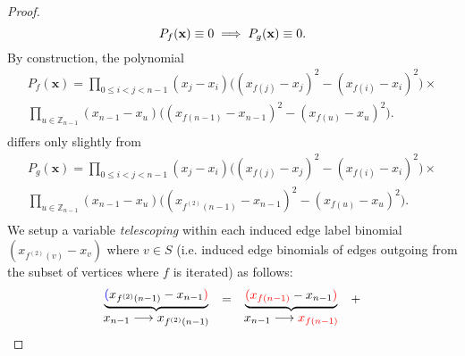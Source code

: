 \begin{proof}
\begin{equation}\label{eq:contrapositive}
    P_{f}({\bf x})\equiv0\implies P_{g}({\bf x})\equiv0.
\end{equation}
By construction, the polynomial
\begin{equation}\label{eq:Pf_broken}
\begin{array}{c}
P_{f}(\mathbf{x})=\underset{0\le i<j<n-1}{\prod}(x_{j}-x_{i})\big((x_{f(j)}-x_{j})^{2}-(x_{f(i)}-x_{i})^{2}\big)\times\\[10pt]
\underset{u\in\mathbb{Z}_{n-1}}{\prod}(x_{n-1}-x_{u})\big((x_{f(n-1)}-x_{n-1})^{2}-(x_{f(u)}-x_{u})^{2}\big).\\[10pt]
\end{array}
\end{equation}
differs only slightly from
\begin{equation}\label{eq:Pg_broken}
\begin{array}{c}
P_{g}(\mathbf{x})=\underset{0\le i<j<n-1}{\prod}(x_{j}-x_{i})\big((x_{f(j)}-x_{j})^{2}-(x_{f(i)}-x_{i})^{2}\big)\times\\[10pt]
\underset{u\in\mathbb{Z}_{n-1}}{\prod}(x_{n-1}-x_{u})\big((x_{f^{(2)}(n-1)}-x_{n-1})^{2}-(x_{f(u)}-x_{u})^{2}\big).\\[10pt]
\end{array}
\end{equation}
We setup a variable \emph{telescoping} within each induced edge label binomial $(x_{f^{\left(2\right)}\left(v\right)}-x_{v})$
where $v\in S$
(i.e. induced edge binomials of edges outgoing from the subset of vertices where $f$ is iterated) as follows:
\[
\begin{array}{c}
\underbrace{{\color{blue}(}x_{f^{(2)}(n-1)}-x_{n-1}{\color{red})}}\\
x_{n-1}\longrightarrow x_{f^{(2)}(n-1)}
\end{array}\begin{array}{c}
=\\
\\
\end{array}\begin{array}{c}
\underbrace{{\color{red}(x_{f(n-1)}}-x_{n-1}{\color{red})}}\\
x_{n-1}\longrightarrow{\color{red}x_{f(n-1)}}
\end{array}\begin{array}{c}
+\\
\\
\end{array}\begin{array}{c}

\end{array}\]
\end{proof}
